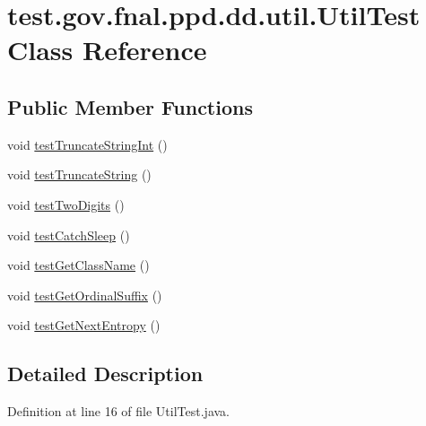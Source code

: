 \hypertarget{classtest_1_1gov_1_1fnal_1_1ppd_1_1dd_1_1util_1_1UtilTest}{\section{test.\-gov.\-fnal.\-ppd.\-dd.\-util.\-Util\-Test Class Reference}
\label{classtest_1_1gov_1_1fnal_1_1ppd_1_1dd_1_1util_1_1UtilTest}
}
\subsection*{Public Member Functions}
\begin{DoxyCompactItemize}
\item 
void \hyperlink{classtest_1_1gov_1_1fnal_1_1ppd_1_1dd_1_1util_1_1UtilTest_ab96943ae8a566fd4b7a0e898a7cd7d43}{test\-Truncate\-String\-Int} ()
\item 
void \hyperlink{classtest_1_1gov_1_1fnal_1_1ppd_1_1dd_1_1util_1_1UtilTest_a0230d77afa30735fb3f9ae40dc3e58fb}{test\-Truncate\-String} ()
\item 
void \hyperlink{classtest_1_1gov_1_1fnal_1_1ppd_1_1dd_1_1util_1_1UtilTest_a7cf05597cbf29ca2f49f8acb84aca276}{test\-Two\-Digits} ()
\item 
void \hyperlink{classtest_1_1gov_1_1fnal_1_1ppd_1_1dd_1_1util_1_1UtilTest_ae7e701f1f7c699e905e7fe6fde2f8969}{test\-Catch\-Sleep} ()
\item 
void \hyperlink{classtest_1_1gov_1_1fnal_1_1ppd_1_1dd_1_1util_1_1UtilTest_a824964e9a30eb87959166de898644c34}{test\-Get\-Class\-Name} ()
\item 
void \hyperlink{classtest_1_1gov_1_1fnal_1_1ppd_1_1dd_1_1util_1_1UtilTest_a488770a4b8fad085ef14f836b3421b80}{test\-Get\-Ordinal\-Suffix} ()
\item 
void \hyperlink{classtest_1_1gov_1_1fnal_1_1ppd_1_1dd_1_1util_1_1UtilTest_a59dcf291281cba49a63d64423941b303}{test\-Get\-Next\-Entropy} ()
\end{DoxyCompactItemize}


\subsection{Detailed Description}


Definition at line 16 of file Util\-Test.\-java.



